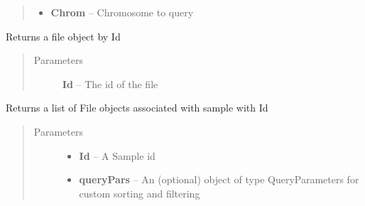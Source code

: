 \documentclass[letterpaper,10pt,english]{sphinxmanual}
\begin{document}
\begin{fulllineitems}
\begin{fulllineitems}
\begin{quote}
\begin{description}
\begin{itemize}
\item {} 
\textbf{Chrom} -- Chromosome to query

\end{itemize}

\end{description}\end{quote}

\end{fulllineitems}


\begin{fulllineitems}
\label{Available modules:BaseSpacePy.api.BaseSpaceAPI.BaseSpaceAPI.getFileById}
Returns a file object by Id
\begin{quote}\begin{description}
\item[{Parameters}] \leavevmode
\textbf{Id} -- The id of the file

\end{description}\end{quote}

\end{fulllineitems}


\begin{fulllineitems}
\label{Available modules:BaseSpacePy.api.BaseSpaceAPI.BaseSpaceAPI.getFilesBySample}
Returns a list of File objects associated with sample with Id
\begin{quote}\begin{description}
\item[{Parameters}] \leavevmode\begin{itemize}
\item {} 
\textbf{Id} -- A Sample id

\item {} 
\textbf{queryPars} -- An (optional) object of type QueryParameters for custom sorting and filtering

\end{itemize}

\end{description}\end{quote}


\end{fulllineitems}
\end{fulllineitems}
\end{document}
